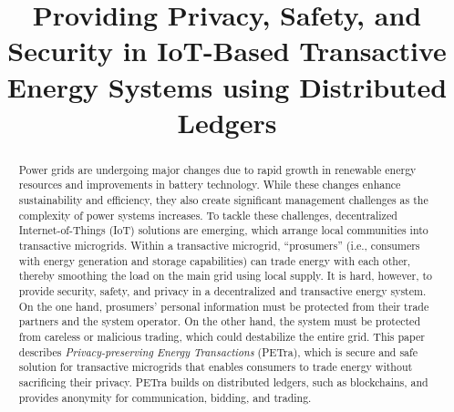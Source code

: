 \documentclass[chi_draft]{sigchi}
\newcommand{\change}[2]{#2} %
\def\plaintitle{Providing Privacy, Safety, and Security in IoT-Based Transactive Energy Systems using Distributed Ledgers}
\begin{document}
\allowdisplaybreaks

\title{\plaintitle}

\author{%
}

\maketitle

\begin{abstract}
Power grids are undergoing major changes due to rapid growth in
renewable energy resources and improvements in battery technology.
While these changes enhance sustainability and efficiency, they also
create significant management challenges as the complexity of power
systems increases.  To tackle these challenges, decentralized
Internet-of-Things (IoT) solutions are emerging, which arrange local
communities into transactive microgrids.  Within a transactive
microgrid, ``prosumers'' (i.e., consumers with energy generation and
storage capabilities) can trade energy with each other, thereby
smoothing the load on the main grid using local supply.  It is hard,
however, to provide security, safety, and privacy in a decentralized
and transactive energy system.  On the one hand, prosumers' personal
information must be protected from their trade partners and the system
operator.  On the other hand, the system must be protected from
careless or malicious trading, which could destabilize the entire
grid.  This paper describes \change{our}{\emph{Privacy-preserving
    Energy Transactions} (PETra)}, which is secure and safe solution
for transactive microgrids that enables consumers to trade energy
without sacrificing their privacy.  \change{Our solution}{PETra}
builds on distributed ledgers, such as blockchains, and provides
anonymity for communication, bidding, and trading.
\end{abstract}
\end{document}
